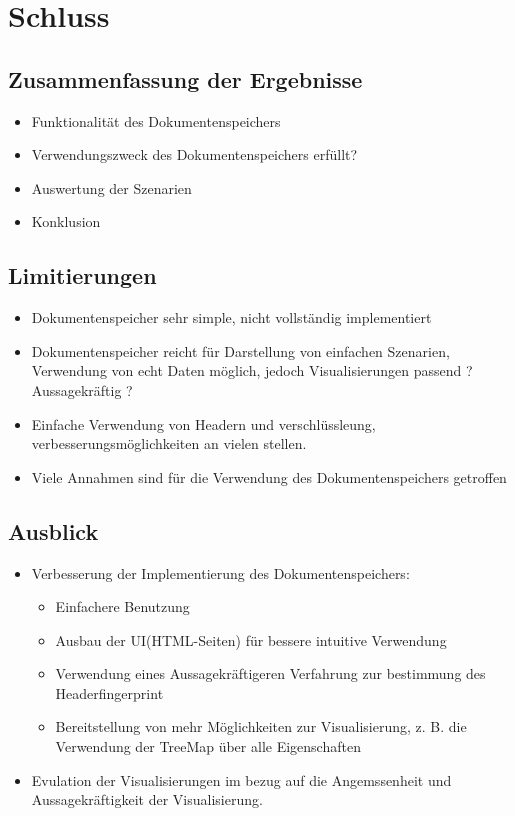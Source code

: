 \documentclass[
    fontsize=12pt,
    headings=small,
    parskip=half,           %
    bibliography=totoc,
    numbers=noenddot,       %
    open=any,               %
    ]{scrreprt}
\begin{document}
\chapter{Schluss}
\section{Zusammenfassung der Ergebnisse}
\begin{itemize}
\item Funktionalität des Dokumentenspeichers
\item Verwendungszweck des Dokumentenspeichers erfüllt?
\item Auswertung der Szenarien
\item Konklusion
\end{itemize}

\section{Limitierungen}
\begin{itemize}
\item Dokumentenspeicher sehr simple, nicht vollständig implementiert
\item Dokumentenspeicher reicht für Darstellung von einfachen Szenarien, Verwendung von echt Daten möglich, jedoch Visualisierungen passend ? Aussagekräftig ?
\item Einfache Verwendung von Headern und verschlüssleung, verbesserungsmöglichkeiten an vielen stellen.
\item Viele Annahmen sind für die Verwendung des Dokumentenspeichers getroffen
\end{itemize}

\section{Ausblick}
\begin{itemize}
\item Verbesserung der Implementierung des Dokumentenspeichers: 
    \begin{itemize}
    \item Einfachere Benutzung
    \item Ausbau der UI(HTML-Seiten) für bessere intuitive Verwendung
    \item Verwendung eines Aussagekräftigeren Verfahrung zur bestimmung des Headerfingerprint
    \item Bereitstellung von mehr Möglichkeiten zur Visualisierung, z. B. die Verwendung der TreeMap über alle Eigenschaften 
    \end{itemize}
\item Evulation der Visualisierungen im bezug auf die Angemssenheit und Aussagekräftigkeit der Visualisierung.
\end{itemize}
\end{document}
